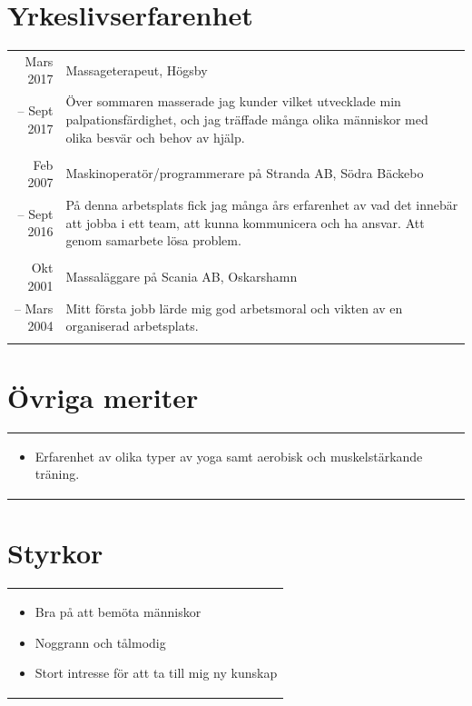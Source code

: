 \documentclass[11pt,a4paper]{article}
\begin{document}
\section{Yrkeslivserfarenhet}
\begin{tabularx}{\textwidth}{r|X}	
	Mars 2017 & Massageterapeut, Högsby \\
	-- Sept 2017 &\footnotesize{Över sommaren masserade jag kunder vilket utvecklade min palpationsfärdighet, och jag träffade många olika människor med olika besvär och behov av hjälp.}\\
	\multicolumn{2}{c}{} \\

	Feb 2007 & Maskinoperatör/programmerare på Stranda AB, Södra Bäckebo \\
	-- Sept 2016&\footnotesize{På denna arbetsplats fick jag många års erfarenhet av vad det innebär att jobba i ett team, att kunna kommunicera och ha ansvar. Att genom samarbete lösa problem.}\\
	\multicolumn{2}{c}{} \\
	
	Okt 2001& Massaläggare på Scania AB, Oskarshamn \\
	-- Mars 2004&\footnotesize{Mitt första jobb lärde mig god arbetsmoral och vikten av en organiserad arbetsplats.}\\
	\multicolumn{2}{c}{} \\

\end{tabularx}

\section{Övriga meriter}
\begin{tabularx}{\textwidth}{X}
	\vspace{-7pt}
\begin{itemize}[leftmargin=1em]
	\item Erfarenhet av olika typer av yoga samt aerobisk och muskelstärkande träning.
\end{itemize}
\end{tabularx}

\section{Styrkor}
\begin{tabularx}{\textwidth}{X}
	\vspace{-7pt}
	\begin{itemize}[leftmargin=1em]
		\item Bra på att bemöta människor
		\item Noggrann och tålmodig
		\item Stort intresse för att ta till mig ny kunskap
	\end{itemize}
\end{tabularx}
\end{document}
